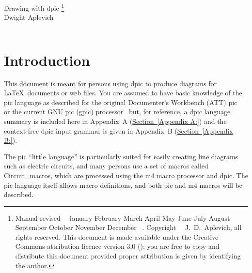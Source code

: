 \documentclass[11pt]{article}
\newcommand{\MONTH}{%
  \ifcase\the\month
  \or January%
  \or February%
  \or March%
  \or April%
  \or May%
  \or June%
  \or July%
  \or August%
  \or September%
  \or October%
  \or November%
  \or December%
  \fi}
\newcommand{\bq}{}
\newcommand{\Dpic}{{\bq Dpic}\xspace}
\newcommand{\dpic}{{\bq dpic}\xspace}
\newcommand{\SR}[1]{\hyperref[#1]{Section~\ref*{#1}}}
\begin{document}
%
\begin{centering}
{\LARGE Drawing with dpic}%
\footnote{\raggedright Manual revised \the\day\ \MONTH\ \the\year.
  Copyright \textcopyright\ \the\year\ J.\ D.\ Aplevich,
  all rights reserved.  This document is made available
  under the Creative Commons attribution licence version 3.0
  ();
  you are free to copy
  and distribute this document provided proper attribution is given by
  identifying the author.
}\\
{\large
Dwight Aplevich}\\
\\
\end{centering}

%
\begin{multicols}{2}
\tableofcontents
\end{multicols}
\section{Introduction}

This document is meant for persons using dpic to produce diagrams for
\LaTeX\ documents or web files.  You are assumed to have basic knowledge
of the pic language as described for the original Documenter's
Workbench (ATT) pic~\cite{KRpic} or the
current GNU pic (gpic) processor~\cite{Raymond95} but,
for reference, a dpic language summary is included here in
Appendix~A (\SR{Appendix A:})
and the context-free dpic input grammar is given in
Appendix~B (\SR{Appendix B:}).

The pic ``little language'' is particularly suited for easily creating
line diagrams such as electric circuits, and many persons use a set of
macros called Circuit\_macros, which are processed using the m4 macro
processor and \dpic.  The pic language itself allows macro definitions,
and both pic and m4 macros will be described.
\end{document}
